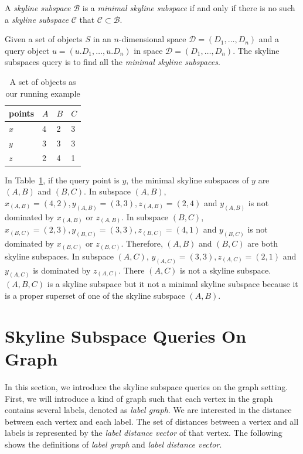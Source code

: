 \begin{definition}
A \emph{skyline subspace} $\mathcal{B}$ is a \emph{minimal skyline subspace} if and only if there is no such a \emph{skyline subspace} $\mathcal{C}$ that $\mathcal{C} \subset \mathcal{B}$.
\end{definition}

\begin{definition}
Given a set of objects $S$ in an $n$-dimensional space $\mathcal{D} = (D_1,\dots,D_n)$ and a query object $u = (u.D_1,\dots,u.D_n)$ in space $\mathcal{D} = (D_1,\dots,D_n)$. The skyline subspaces query is to find all the \emph{minimal skyline subspaces}.
\end{definition}

\begin{table}[h]
    \centering
    \begin{tabular}{|l|l|l|l|}
    \hline
    points & $A$ & $B$ & $C$ \\ \hline
    $x$      & 4 & 2 & 3 \\ \hline
    $y$      & 3 & 3 & 3 \\ \hline
    $z$      & 2 & 4 & 1 \\ \hline
    \end{tabular}
    \caption{\label{tab:objects_example} A set of objects as our running example }
    
\end{table}

In Table~\ref{tab:objects_example}, if the query point is $y$, the minimal skyline subspaces of $y$ are $(A, B)$ and $(B, C)$. In subspace $(A, B)$, $x_{(A, B)} = (4, 2), y_{(A, B)} = (3, 3), z_{(A, B)} = (2, 4)$ and $y_{(A, B)}$ is not dominated by $x_{(A, B)}$ or $z_{(A, B)}$. 
In subspace $(B, C)$, $x_{(B, C)} = (2, 3), y_{(B, C)} = (3, 3), z_{(B, C)} = (4, 1)$ and $y_{(B, C)}$ is not dominated by $x_{(B, C)}$ or $z_{(B, C)}$. Therefore, $(A, B)$ and $(B, C)$ are both skyline subspaces. 
In subspace $(A, C)$, $y_{(A, C)} = (3, 3), z_{(A, C)} = (2, 1)$ and $y_{(A, C)}$ is dominated by $z_{(A, C)}$. There $(A, C)$ is not a skyline subspace. 
$(A, B, C)$ is a skyline subspace but it not a minimal skyline subspace because it is a proper superset of one of the skyline subspace $(A, B)$.

\section{Skyline Subspace Queries On Graph}
In this section, we introduce the skyline subspace queries on the graph setting. First, we will introduce a kind of graph such that each vertex in the graph contains several labels, denoted as \emph{label graph}. We are interested in the distance between each vertex and each label. The set of distances between a vertex and all labels is represented by the \emph{label distance vector} of that vertex. The following shows the definitions of \emph{label graph} and \emph{label distance vector}.

